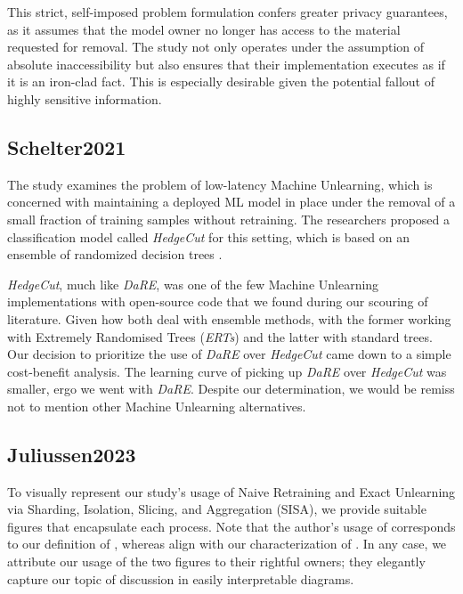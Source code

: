         This strict, self-imposed problem formulation confers greater privacy guarantees, as it assumes that the model owner no longer has access to the material requested for removal. The study not only operates under the assumption of absolute inaccessibility but also ensures that their implementation executes as if it is an iron-clad fact. This is especially desirable given the potential fallout of highly sensitive information.
    
    \subsection{Schelter2021}
    \label{subsec:Schelter2021}
    
        The study examines the problem of low-latency Machine Unlearning, which is concerned with maintaining a deployed ML model in place under the removal of a small fraction of training samples without retraining. The researchers proposed a classification model called \textit{HedgeCut} for this setting, which is based on an ensemble of randomized decision trees \cite{Schelter2021}.
        
        \textit{HedgeCut}, much like \textit{DaRE}, was one of the few Machine Unlearning implementations with open-source code that we found during our scouring of literature. Given how both deal with ensemble methods, with the former working with Extremely Randomised Trees (\textit{ERTs}) and the latter with standard trees. Our decision to prioritize the use of \textit{DaRE} over \textit{HedgeCut} came down to a simple cost-benefit analysis. The learning curve of picking up \textit{DaRE} over \textit{HedgeCut} was smaller, ergo we went with \textit{DaRE}. Despite our determination, we would be remiss not to mention other Machine Unlearning alternatives.
    
    \subsection{Juliussen2023}
    \label{subsec:Juliussen2023}
    
        To visually represent our study's usage of Naive Retraining and Exact Unlearning via Sharding, Isolation, Slicing, and Aggregation (SISA), we provide suitable figures that encapsulate each process. Note that the author's usage of  corresponds to our definition of , whereas  align with our characterization of . In any case, we attribute our usage of the two figures to their rightful owners; they elegantly capture our topic of discussion in easily interpretable diagrams.
        

